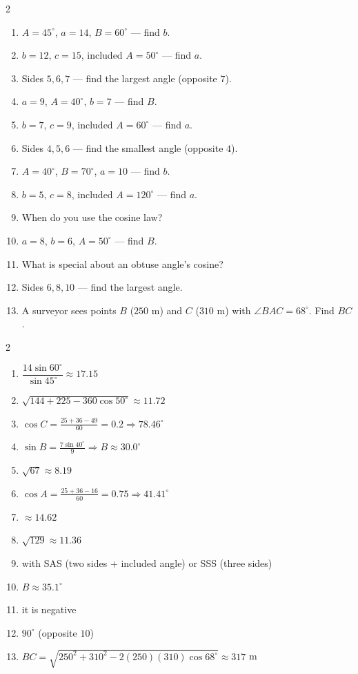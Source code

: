 \documentclass[11pt]{article}
\begin{document}
\begin{recapbox}
\begin{multicols}{2}
\small
\begin{enumerate}[leftmargin=*,itemsep=3pt]
  \item $A=45^\circ$, $a=14$, $B=60^\circ$ — find $b$.
  \item $b=12$, $c=15$, included $A=50^\circ$ — find $a$.
  \item Sides $5,6,7$ — find the largest angle (opposite $7$).
  \item $a=9$, $A=40^\circ$, $b=7$ — find $B$.
  \item $b=7$, $c=9$, included $A=60^\circ$ — find $a$.
  \item Sides $4,5,6$ — find the smallest angle (opposite $4$).
  \item $A=40^\circ$, $B=70^\circ$, $a=10$ — find $b$.
  \item $b=5$, $c=8$, included $A=120^\circ$ — find $a$.
  \item When do you use the cosine law?
  \item $a=8$, $b=6$, $A=50^\circ$ — find $B$.
  \item What is special about an obtuse angle's cosine?
  \item Sides $6,8,10$ — find the largest angle.
  \item A surveyor sees points $B$ ($250$ m) and $C$ ($310$ m) with $\angle BAC=68^\circ$. Find $BC$.
\end{enumerate}
\end{multicols}
\end{recapbox}

\begin{keybox}
\begin{multicols}{2}
\small
\begin{enumerate}[leftmargin=*,itemsep=3pt]
  \item $\dfrac{14\sin60^\circ}{\sin45^\circ}\approx17.15$
  \item $\sqrt{144+225-360\cos50^\circ}\approx11.72$
  \item $\cos C=\tfrac{25+36-49}{60}=0.2\Rightarrow78.46^\circ$
  \item $\sin B=\tfrac{7\sin40^\circ}{9}\Rightarrow B\approx30.0^\circ$
  \item $\sqrt{67}\approx8.19$
  \item $\cos A=\tfrac{25+36-16}{60}=0.75\Rightarrow41.41^\circ$
  \item $\approx14.62$
  \item $\sqrt{129}\approx11.36$
  \item with SAS (two sides + included angle) or SSS (three sides)
  \item $B\approx35.1^\circ$
  \item it is negative
  \item $90^\circ$ (opposite $10$)
  \item $BC=\sqrt{250^2+310^2-2(250)(310)\cos68^\circ}\approx317$ m
\end{enumerate}
\end{multicols}
\end{keybox}
\end{document}
